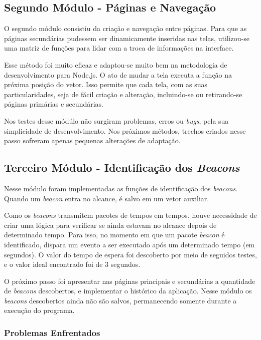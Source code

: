 \subsection{Segundo Módulo - Páginas e Navegação}\label{sec:segundo-modulo}

O segundo módulo consistiu da criação e navegação entre páginas. Para que as páginas secundárias pudessem ser dinamicamente inseridas nas telas, utilizou-se uma matriz de funções para lidar com a troca de informações na interface. 

Esse método foi muito eficaz e adaptou-se muito bem na metodologia de desenvolvimento para Node.js. O ato de mudar a tela executa a função na próxima posição do vetor. Isso permite que cada tela, com as suas particularidades, seja de fácil criação e alteração, incluindo-se ou retirando-se páginas primárias e secundárias.

Nos testes desse módúlo não surgiram problemas, erros ou \textit{bugs}, pela sua simplicidade de desenvolvimento. Nos próximos métodos, trechos criados nesse passo sofreram apenas pequenas alterações de adaptação.

\subsection{Terceiro Módulo - Identificação dos \textit{Beacons}}\label{sec:terceiro-modulo}

Nesse módulo foram implementadas as funções de identificação dos \textit{beacons}. Quando um \textit{beacon} entra no alcance, é salvo em um vetor auxiliar. 

Como os \textit{beacons} transmitem pacotes de tempos em tempos, houve necessidade de criar uma lógica para verificar se ainda estavam no alcance depois de determinado tempo. Para isso, no momento em que um pacote \textit{beacon} é identificado, dispara um evento a ser executado após um determinado tempo (em segundos). O valor do tempo de espera foi descoberto por meio de seguidos testes, e o valor ideal encontrado foi de 3 segundos.

O próximo passo foi apresentar nas páginas principais e secundárias a quantidade de \textit{beacons} descobertos, e implementar o histórico da aplicação. Nesse módulo os \textit{beacons} descobertos ainda não são salvos, permanecendo somente durante a execução do programa.

\subsubsection{Problemas Enfrentados}\label{sec:problema-quarto-modulo}

